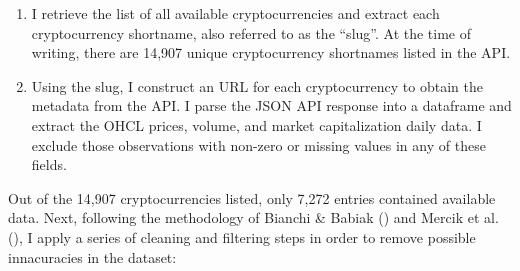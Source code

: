 \documentclass[
  12pt,
  a4paper,
  openany]{scrbook}
\begin{document}
\begin{enumerate}
\def\labelenumi{\arabic{enumi}.}
\item
  I retrieve the list of all available cryptocurrencies and extract each
  cryptocurrency shortname, also referred to as the ``slug''. At the
  time of writing, there are 14,907 unique cryptocurrency shortnames
  listed in the API.
\item
  Using the slug, I construct an URL for each cryptocurrency to obtain
  the metadata from the API. I parse the JSON API response into a
  dataframe and extract the OHCL prices, volume, and market
  capitalization daily data. I exclude those observations with non-zero
  or missing values in any of these fields.
\end{enumerate}

Out of the 14,907 cryptocurrencies listed, only 7,272 entries contained
available data. Next, following the methodology of Bianchi \& Babiak
() and Mercik
et al.
(),
I apply a series of cleaning and filtering steps in order to remove
possible innacuracies in the dataset:
\end{document}
